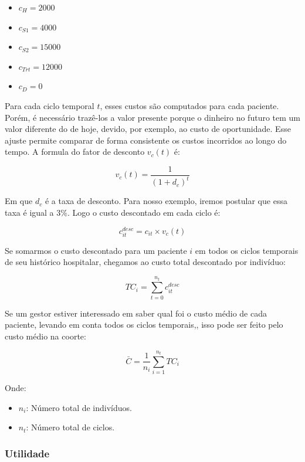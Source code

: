 \documentclass[12pt]{article}
\theoremstyle{break}
\begin{document}
\begin{itemize}
    \item $c_H = 2000$

    \item $c_{S1} = 4000$ 

    \item $c_{S2} = 15000$ 

    \item $c_{Trt} = 12000$

    \item $c_{D} =  0$
\end{itemize}



Para cada ciclo temporal $t$, esses custos são computados para cada paciente. Porém, é necessário trazê-los a valor presente porque o dinheiro no futuro tem um valor diferente do de hoje, devido, por exemplo, ao  custo de oportunidade. Esse ajuste permite comparar de forma consistente os custos incorridos ao longo do tempo. A formula do fator de desconto $v_{c}(t)$ é:


    \[
    v_{c}(t) = \frac{1}{(1 + d_c)^t}
    \]


Em que  $d_c$ é a taxa de desconto. Para nosso exemplo, iremos postular que essa taxa é igual a $3\%$. Logo o custo descontado em cada ciclo é:


    \[
    c_{it}^{desc} = c_{it} \times v_{c}(t)
    \]



Se somarmos o custo descontado para um paciente $i$ em todos os ciclos temporais de seu histórico hospitalar, chegamos ao custo total descontado por indivíduo:
    

    \[
    TC_i = \sum_{t=0}^{n_t} c_{it}^{desc}
    \]


Se um gestor estiver interessado em saber qual foi o custo médio de cada paciente, levando em conta todos os ciclos temporais,, isso pode ser feito pelo custo médio na coorte:

\[
\bar{C} = \frac{1}{n_i} \sum_{i=1}^{n_t} TC_i
 \]


Onde:
\begin{itemize}
    \item \( n_i \): Número total de indivíduos.
    \item \( n_t \): Número total de ciclos.
\end{itemize}

\subsubsection{Utilidade}
\end{document}

